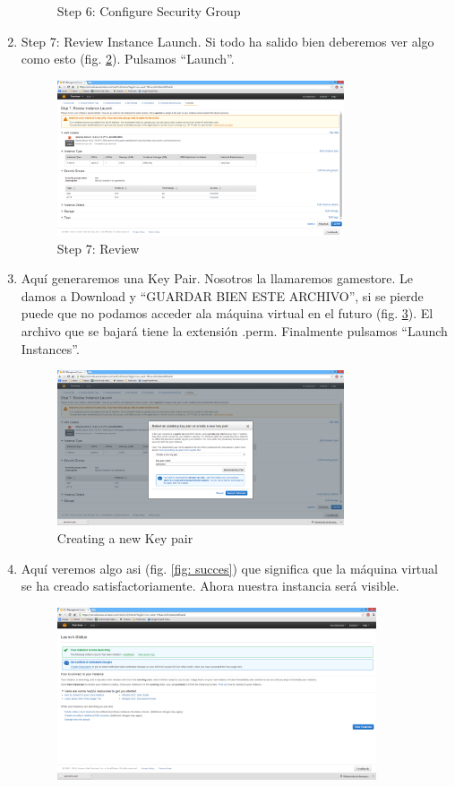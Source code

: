 \documentclass[a4paper,10pt]{scrartcl}
\begin{document}
\begin{enumerate}
\begin{figure}[htb!]
		\caption{Step 6: Configure Security Group}
		\label{fig: security_group}
	\end{figure}
	\item Step 7: Review Instance Launch. Si todo ha salido bien deberemos ver algo como esto (fig. \ref{fig: review}). Pulsamos ``Launch''.
	\begin{figure}[htb!]
		\centering
		\includegraphics[width=0.8\textwidth] {review.png}
		\caption{Step 7: Review}
		\label{fig: review}
	\end{figure}
	\item Aquí generaremos una Key Pair. Nosotros la llamaremos gamestore. Le damos a Download y ``GUARDAR BIEN ESTE ARCHIVO'', si se pierde puede que no podamos acceder ala máquina virtual en el futuro (fig. \ref{fig: keypair}). El archivo que se bajará tiene la extensión .perm. Finalmente pulsamos ``Launch Instances''.
	\begin{figure}[htb!]
		\centering
		\includegraphics[width=0.8\textwidth] {keypair.png}
		\caption{Creating a new Key pair}
		\label{fig: keypair}
	\end{figure}
	\item Aquí veremos algo asi (fig. \ref{fig: succes}) que significa que la máquina virtual se ha creado satisfactoriamente. Ahora nuestra instancia será visible.
	\begin{figure}[htb!]
		\centering
		\includegraphics[width=0.89\textwidth] {success.png}

\end{figure}
\end{enumerate}
\end{document}
